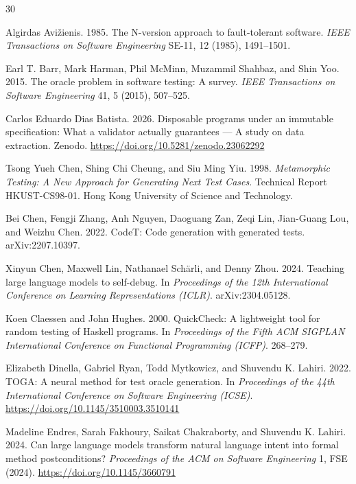 \documentclass[sigconf,nonacm]{acmart}
\begin{document}

\begin{thebibliography}{30}

Algirdas Avižienis. 1985.
The N-version approach to fault-tolerant software.
\textit{IEEE Transactions on Software Engineering} SE-11, 12 (1985), 1491--1501.

Earl T. Barr, Mark Harman, Phil McMinn, Muzammil Shahbaz, and Shin Yoo. 2015.
The oracle problem in software testing: A survey.
\textit{IEEE Transactions on Software Engineering} 41, 5 (2015), 507--525.

Carlos Eduardo Dias Batista. 2026.
Disposable programs under an immutable specification: What a validator actually guarantees --- A study on data extraction.
Zenodo. \url{https://doi.org/10.5281/zenodo.23062292}

Tsong Yueh Chen, Shing Chi Cheung, and Siu Ming Yiu. 1998.
\textit{Metamorphic Testing: A New Approach for Generating Next Test Cases}.
Technical Report HKUST-CS98-01. Hong Kong University of Science and Technology.

Bei Chen, Fengji Zhang, Anh Nguyen, Daoguang Zan, Zeqi Lin, Jian-Guang Lou, and Weizhu Chen. 2022.
CodeT: Code generation with generated tests.
arXiv:2207.10397.

Xinyun Chen, Maxwell Lin, Nathanael Schärli, and Denny Zhou. 2024.
Teaching large language models to self-debug.
In \textit{Proceedings of the 12th International Conference on Learning Representations (ICLR)}. arXiv:2304.05128.

Koen Claessen and John Hughes. 2000.
QuickCheck: A lightweight tool for random testing of Haskell programs.
In \textit{Proceedings of the Fifth ACM SIGPLAN International Conference on Functional Programming (ICFP)}. 268--279.

Elizabeth Dinella, Gabriel Ryan, Todd Mytkowicz, and Shuvendu K. Lahiri. 2022.
TOGA: A neural method for test oracle generation.
In \textit{Proceedings of the 44th International Conference on Software Engineering (ICSE)}. \url{https://doi.org/10.1145/3510003.3510141}

Madeline Endres, Sarah Fakhoury, Saikat Chakraborty, and Shuvendu K. Lahiri. 2024.
Can large language models transform natural language intent into formal method postconditions?
\textit{Proceedings of the ACM on Software Engineering} 1, FSE (2024). \url{https://doi.org/10.1145/3660791}


\end{thebibliography}
\end{document}
